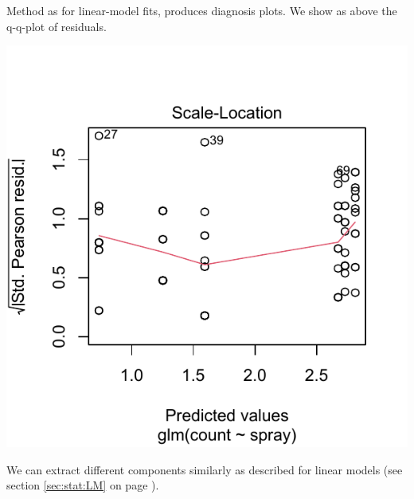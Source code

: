 \documentclass[krantz2]{krantz}\usepackage{knitr}
\begin{document}
Method  as for linear-model fits, produces diagnosis plots. We show as above the q-q-plot of residuals.

\begin{knitrout}\footnotesize
{}\color{fgcolor}\begin{kframe}
\begin{alltt}
  \hlstd{=} \hlstd{)}
\end{alltt}
\end{kframe}

{\centering \includegraphics[width=.54\textwidth]{figure/pos-model-11-1} 

}



\end{knitrout}

We can extract different components similarly as described for linear models (see section \ref{sec:stat:LM} on page \pageref{sec:stat:LM}).
\end{document}
